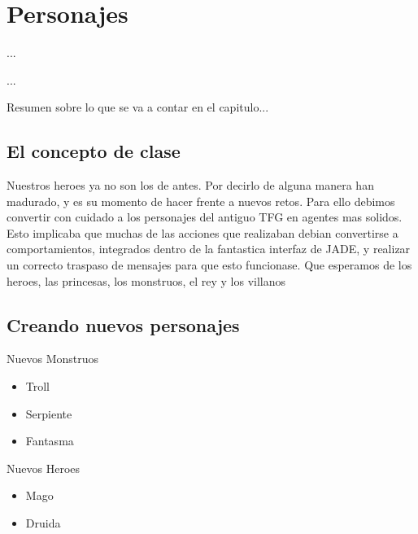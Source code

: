 
%
%

\chapter{Personajes}

\begin{FraseCelebre}
\begin{Frase}
...
\end{Frase}
\begin{Fuente}
...
\end{Fuente}
\end{FraseCelebre}

\begin{resumen}
Resumen sobre lo que se va a contar en el capitulo...
\end{resumen}


\section{El concepto de clase}
\label{cap23:sec:personajes}

Nuestros heroes ya no son los de antes. Por decirlo de alguna manera han madurado, y es su momento de hacer frente a nuevos retos.
Para ello debimos convertir con cuidado a los personajes del antiguo TFG en agentes mas solidos. Esto implicaba que muchas de las acciones que realizaban debian convertirse a comportamientos, integrados dentro de la fantastica interfaz de JADE, y realizar un correcto traspaso de mensajes para que esto funcionase.
Que esperamos de los heroes, las princesas, los monstruos, el rey y los villanos


\section{Creando nuevos personajes}
Nuevos Monstruos
\begin{itemize}
	\item Troll
	\item Serpiente
	\item Fantasma
\end{itemize}

Nuevos Heroes
\begin{itemize}
	\item Mago
	\item Druida
\end{itemize}

